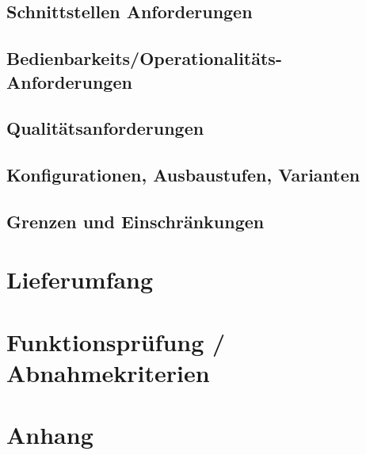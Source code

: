 \subsection{Schnittstellen Anforderungen}


\subsection{Bedienbarkeits/Operationalitäts-Anforderungen}


\subsection{Qualitätsanforderungen}


\subsection{Konfigurationen, Ausbaustufen, Varianten}


\subsection{Grenzen und Einschränkungen}



\section{Lieferumfang}



\section{Funktionsprüfung / Abnahmekriterien}


\section{Anhang}
